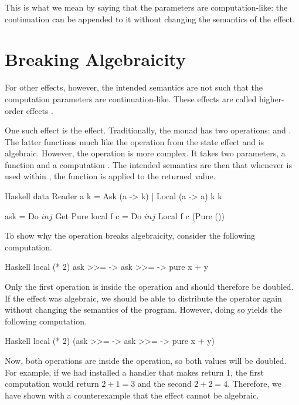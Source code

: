 This is what we mean by saying that the parameters are computation-like: the continuation can be appended to it without changing the semantics of the effect.

\section{Breaking Algebraicity}

For other effects, however, the intended semantics are not such that the computation parameters are continuation-like. These effects are called higher-order effects \citationneeded.

One such effect is the  effect. Traditionally, the  monad has two operations:  and . The latter functions much like the  operation from the state effect and is algebraic. However, the  operation is more complex. It takes two parameters, a function  and a computation . The intended semantics are then that whenever  is used within , the function  is applied to the returned value.

\begin{lst}{Haskell}
data Reader a k = Ask (a -> k) | Local (a -> a) k k

ask       = Do $ inj $ Get Pure
local f c = Do $ inj $ Local f c (Pure ())
\end{lst}
%
To show why the  operation breaks algebraicity, consider the following computation.

\begin{lst}{Haskell}
local (* 2) ask >>= \x -> ask >>= \y -> pure x + y
\end{lst}
%
Only the first  operation is inside the  operation and should therefore be doubled. If the  effect was algebraic, we should be able to distribute the \hs{>>=} operator again without changing the semantics of the program. However, doing so yields the following computation.

\begin{lst}{Haskell}
local (* 2) (ask >>= \x -> ask >>= \y -> pure x + y)
\end{lst}
%
Now, both  operations are inside the  operation, so both values will be doubled. For example, if we had installed a handler that makes  return 1, the first computation would return $2 + 1 = 3$ and the second $2 + 2 = 4$. Therefore, we have shown with a counterexample that the  effect cannot be algebraic.

